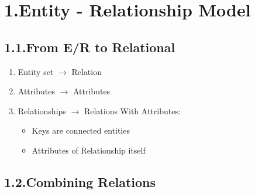 \documentclass{article}
\begin{document}
\mdxtitleblockstart{}
\mdxauthorstart{}
\mdxauthorend\mdtitleauthorrunning{}{}\mdxtitleblockend%

\section{1.\hspace*{0.5em}Entity - Relationship Model}\label{sec-entity---relationship-model}%

\subsection{1.1.\hspace*{0.5em}From E/R to Relational}\label{sec-from-er-to-relational}%

\begin{enumerate}[noitemsep,topsep=\mdcompacttopsep]%

\item{}Entity set \ensuremath{\rightarrow} Relation%

\item{}Attributes \ensuremath{\rightarrow} Attributes%

\item{}Relationships \ensuremath{\rightarrow} Relations\mdbr
{}With Attributes:

\begin{itemize}[noitemsep,topsep=\mdcompacttopsep]%

\item{}Keys are connected entities%

\item{}Attributes of Relationship itself%
\end{itemize}%
\end{enumerate}%

\subsection{1.2.\hspace*{0.5em}Combining Relations}\label{sec-combining-relations}%
\end{document}

